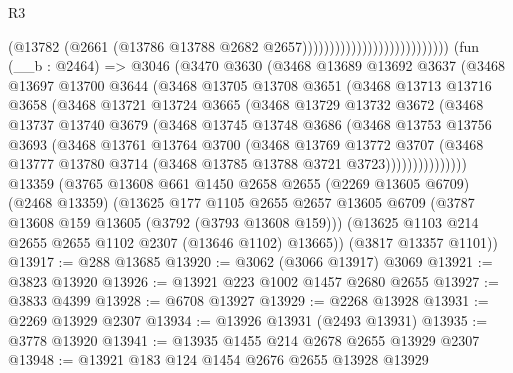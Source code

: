\begin{lexlean}{R3}
\begin{coremodule}
                                                    (@13782
                                                      (@2661
                                                        (@13786
                                                          @13788
                                                          @2682
                                                          @2657)))))))))))))))))))))))))))
    (fun (__b : @2464) =>
    @3046
      (@3470
        @3630
        (@3468
          @13689
          @13692
          @3637
          (@3468
            @13697
            @13700
            @3644
            (@3468
              @13705
              @13708
              @3651
              (@3468
                @13713
                @13716
                @3658
                (@3468
                  @13721
                  @13724
                  @3665
                  (@3468
                    @13729
                    @13732
                    @3672
                    (@3468
                      @13737
                      @13740
                      @3679
                      (@3468
                        @13745
                        @13748
                        @3686
                        (@3468
                          @13753
                          @13756
                          @3693
                          (@3468
                            @13761
                            @13764
                            @3700
                            (@3468
                              @13769
                              @13772
                              @3707
                              (@3468
                                @13777
                                @13780
                                @3714
                                (@3468 @13785 @13788 @3721 @3723)))))))))))))))
    @13359
    (@3765
      @13608
      @661
      @1450
      @2658
      @2655
      (@2269 @13605 @6709)
      (@2468 @13359)
      (@13625
        @177
        @1105
        @2655
        @2657
        @13605
        @6709
        (@3787 @13608 @159 @13605 (@3792 (@3793 @13608 @159)))
        (@13625 @1103 @214 @2655 @2655 @1102 @2307 (@13646 @1102) @13665))
      (@3817 @13357 @1101))
@13917 := @288 @13685
@13920 := @3062 (@3066 @13917) @3069
@13921 := @3823 @13920
@13926 := @13921 @223 @1002 @1457 @2680 @2655
@13927 := @3833 @4399
@13928 := @6708 @13927
@13929 := @2268 @13928
@13931 := @2269 @13929 @2307
@13934 := @13926 @13931 (@2493 @13931)
@13935 := @3778 @13920
@13941 := @13935 @1455 @214 @2678 @2655 @13929 @2307
@13948 := @13921 @183 @124 @1454 @2676 @2655 @13928 @13929

\end{coremodule}
\end{lexlean}
